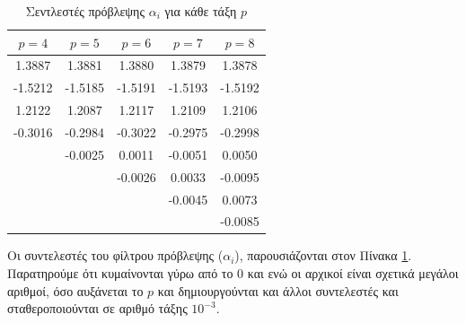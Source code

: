 \documentclass[a4paper]{article}
\begin{document}
        \begin{table}[h!]
            \centering
            \begin{tabular}{c  | c  | c  | c   | c}
                $p=4$       & $p=5$     & $p=6$     & $p=7$     & $p=8$     \\ 
                \hline
                1.3887	    &1.3881	    &1.3880	    &1.3879	    &1.3878     \\
                -1.5212     &-1.5185    &-1.5191    &-1.5193    &-1.5192    \\
                1.2122      &1.2087     &1.2117     &1.2109     &1.2106     \\
                -0.3016     &-0.2984    &-0.3022    &-0.2975    &-0.2998    \\
                            &-0.0025    &0.0011     &-0.0051    &0.0050     \\
                            &           &-0.0026    &0.0033     &-0.0095    \\
                            &           &           &-0.0045    &0.0073     \\
                            &           &           &           &-0.0085
            \end{tabular}
            \caption{Σεντλεστές πρόβλεψης $\alpha_i$ για κάθε τάξη $p$} 
            \label{table:a_factors}
        \end{table}
        Oι συντελεστές του φίλτρου πρόβλεψης ($\alpha_i$), παρουσιάζονται στον Πίνακα \ref{table:a_factors}.
        Παρατηρούμε ότι κυμαίνονται γύρω από το 0 και ενώ οι αρχικοί είναι σχετικά μεγάλοι αριθμοί, όσο αυξάνεται το $p$ και δημιουργούνται και άλλοι συντελεστές και σταθεροποιούνται 
        σε αριθμό τάξης $10^{-3}$.
\end{document}
